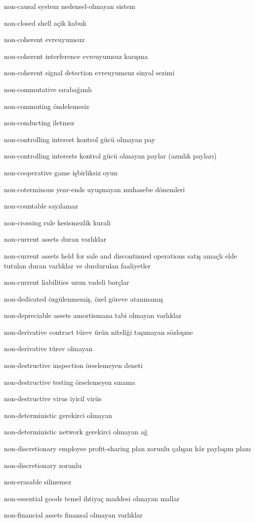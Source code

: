 \documentclass[12pt,fleqn]{article}\usepackage{../../common}
\begin{document}
non-causal system nedensel-olmayan sistem

non-closed shell açik kabuk

non-coherent evreuyumsuz

non-coherent interference evreuyumsuz karışma

non-coherent signal detection evreuyumsuz sinyal sezimi

non-commutative sırabağımlı

non-commuting öndelemesiz

non-conducting iletmez

non-controlling interest kontrol gücü olmayan pay

non-controlling interests kontrol gücü olmayan paylar (azınlık payları)

non-cooperative game işbirliksiz oyun

non-coterminous year-ends uyuşmayan muhasebe dönemleri

non-countable sayılamaz

non-crossing rule kesismezlik kurali

non-current assets duran varlıklar

non-current assets held for sale and discontinued operations satış amaçlı elde tutulan duran varlıklar ve durdurulan faaliyetler

non-current liabilities uzun vadeli borçlar

non-dedicated özgülenmemiş, özel göreve atanmamış

non-depreciable assets amortismana tabi olmayan varlıklar

non-derivative contract türev ürün niteliği taşımayan sözleşme

non-derivative türev olmayan

non-destructive inspection örselemeyen deneti

non-destructive testing örselemeyen sınama

non-destructive virus iyicil virüs

non-deterministic gerekirci olmayan

non-deterministic network gerekirci olmayan ağ

non-discretionary employee profit-sharing plan zorunlu çalışan kâr paylaşım planı

non-discretionary zorunlu

non-erasable silinemez

non-essential goods temel ihtiyaç maddesi olmayan mallar

non-financial assets finansal olmayan varlıklar
\end{document}
